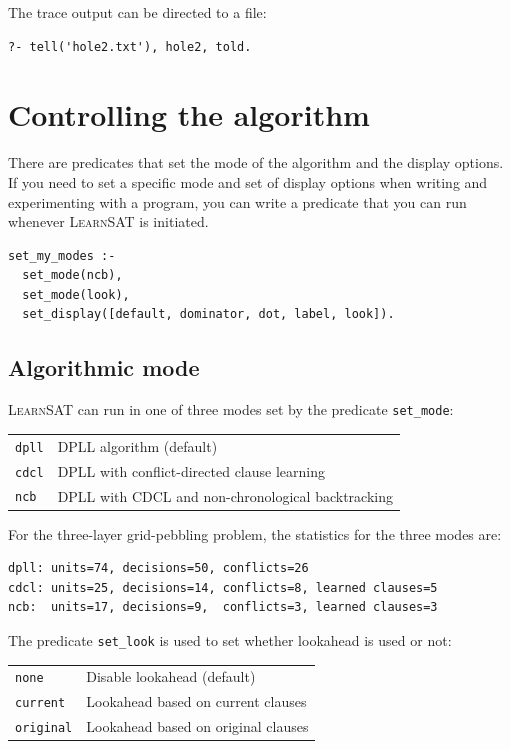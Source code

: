\documentclass[11pt]{article}
\newcommand*{\p}[1]{\textup{\texttt{#1}}}
\newcommand*{\ls}{\textsc{LearnSAT}}
\begin{document}
The trace output can be directed to a file:

\begin{verbatim}
?- tell('hole2.txt'), hole2, told.
\end{verbatim}


\section{Controlling the algorithm}

There are predicates that set the mode of the algorithm and the display options. If you need to set a specific mode and set of display options when writing and experimenting with a program, you can write a predicate that you can run whenever \ls{} is initiated.

\begin{verbatim}
set_my_modes :-
  set_mode(ncb), 
  set_mode(look),
  set_display([default, dominator, dot, label, look]).
\end{verbatim}

\newpage

\subsection{Algorithmic mode}

\ls{} can run in one of three modes set by the predicate \p{set\_mode}:

\begin{center}
\begin{tabular}{|l|l|}
\hline
\p{dpll} & DPLL algorithm (default)\\
\p{cdcl} & DPLL with conflict-directed clause learning\\
\p{ncb} &  DPLL with CDCL and non-chronological backtracking\\
\hline
\end{tabular}
\end{center}

For the three-layer grid-pebbling problem, the statistics for the three modes are:
\begin{verbatim}
dpll: units=74, decisions=50, conflicts=26
cdcl: units=25, decisions=14, conflicts=8, learned clauses=5
ncb:  units=17, decisions=9,  conflicts=3, learned clauses=3
\end{verbatim}

The predicate \p{set\_look} is used to set whether lookahead is used or not:
\begin{center}
\begin{tabular}{|l|l|}
\hline
\p{none} & Disable lookahead (default)\\
\p{current} & Lookahead based on current clauses\\
\p{original} & Lookahead based on original clauses\\
\hline
\end{tabular}
\end{center}
\end{document}
